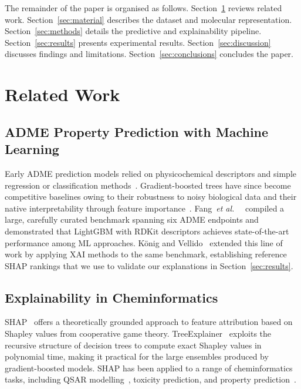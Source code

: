 \documentclass[a4paper, 11pt]{article}
\newcommand{\etal}{\textit{et al.}\ }
\begin{document}
The remainder of the paper is organised as follows.
Section~\ref{sec:related} reviews related work.
Section~\ref{sec:material} describes the dataset and molecular
representation. Section~\ref{sec:methods} details the predictive and
explainability pipeline. Section~\ref{sec:results} presents experimental
results. Section~\ref{sec:discussion} discusses findings and limitations.
Section~\ref{sec:conclusions} concludes the paper.


\section{Related Work}
\label{sec:related}

\subsection{ADME Property Prediction with Machine Learning}

Early ADME prediction models relied on physicochemical descriptors and
simple regression or classification methods~\cite{lipinski2001experimental}.
Gradient-boosted trees have since become competitive baselines owing to
their robustness to noisy biological data and their native interpretability
through feature importance~\cite{chen2016xgboost}. Fang~\etal~\cite{fang2023prospective}
compiled a large, carefully curated benchmark spanning six ADME endpoints
and demonstrated that LightGBM with RDKit descriptors achieves state-of-the-art
performance among ML approaches. König and Vellido~\cite{konig2024adme}
extended this line of work by applying XAI methods to the same benchmark,
establishing reference SHAP rankings that we use to validate our
explanations in Section~\ref{sec:results}.

\subsection{Explainability in Cheminformatics}

SHAP~\cite{lundberg2017unified} offers a theoretically grounded approach to
feature attribution based on Shapley values from cooperative game theory.
TreeExplainer~\cite{lundberg2020local} exploits the recursive structure of
decision trees to compute exact Shapley values in polynomial time, making it
practical for the large ensembles produced by gradient-boosted models.
SHAP has been applied to a range of cheminformatics tasks, including QSAR
modelling~\cite{rodriguez2021shap}, toxicity prediction, and property
prediction~\cite{konig2024adme}.
\end{document}
